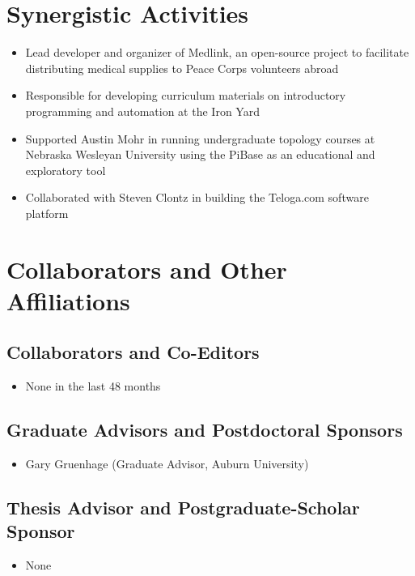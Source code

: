 
\section{Synergistic Activities}

\begin{itemize}

  \item Lead developer and organizer of Medlink, an open-source project to facilitate distributing medical supplies to Peace Corps volunteers abroad
  \item Responsible for developing curriculum materials on introductory programming and automation at the Iron Yard
  \item Supported Austin Mohr in running undergraduate topology courses at Nebraska Wesleyan University using the PiBase as an educational and exploratory tool
  \item Collaborated with Steven Clontz in building the Teloga.com software platform
\end{itemize}


\section{Collaborators and Other Affiliations}

\subsection{Collaborators and Co-Editors}
\begin{itemize}
  \item None in the last 48 months
\end{itemize}
\subsection{Graduate Advisors and Postdoctoral Sponsors}
\begin{itemize}
  \item Gary Gruenhage (Graduate Advisor, Auburn University)
\end{itemize}
\subsection{Thesis Advisor and Postgraduate-Scholar Sponsor}
\begin{itemize}
  \item None
\end{itemize}
